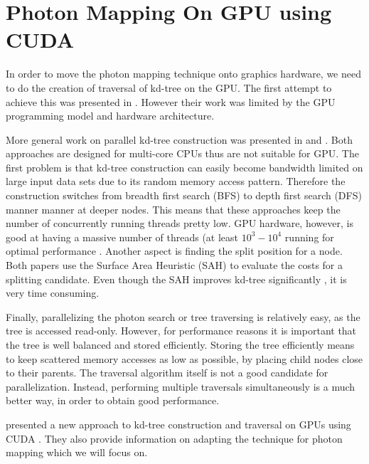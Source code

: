 
\section{Photon Mapping On GPU using CUDA}

In order to move the photon mapping technique onto graphics hardware, we need to do the creation of traversal of kd-tree on the GPU. The first attempt to achieve this was presented in \cite{Purcell:2005:PMP:1198555.1198797}. However their work was limited by the GPU programming model and hardware architecture.

More general work on parallel kd-tree construction was presented in \cite{popov:06:ESC} and \cite{Shevtsov_highlyparallel}. Both approaches are designed for multi-core CPUs thus are not suitable for GPU. The first problem is that kd-tree construction can easily become bandwidth limited on large input data sets due to its random memory access pattern. Therefore the construction switches from breadth first search (BFS) to depth first search (DFS) manner manner at deeper nodes. This means that these approaches keep the number of concurrently running threads pretty low. GPU hardware, however, is good at having a massive number of threads (at least \(10^{3} - 10^{4}\) running for
optimal performance \cite{Guide2012}.
Another aspect is finding the split position for a node. Both papers use the Surface Area Heuristic (SAH) \cite{springerlink:10.1007/BF01911006} to evaluate the costs for a splitting candidate. Even though the SAH improves kd-tree significantly \cite{wald::PhD}, it is very time consuming.

Finally, parallelizing the photon search or tree traversing is relatively easy, as the tree is accessed read-only. However, for performance reasons it is important that the tree is well balanced and stored efficiently. Storing the tree efficiently means to keep scattered memory accesses as low as possible, by placing child nodes close to their parents. The traversal algorithm itself is not a good candidate for parallelization. Instead, performing multiple traversals simultaneously is a much better way, in order to obtain good performance.

\citeauthor{Zhou2008} presented a new approach to kd-tree construction and traversal on GPUs using CUDA \cite{Zhou2008}. They also provide information on adapting the technique for photon mapping which we will focus on.

